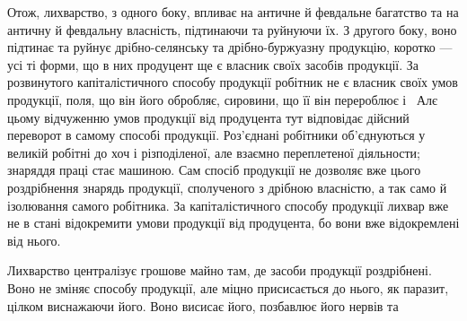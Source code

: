 Отож, лихварство, з одного боку, впливає на античне й февдальне багатство
та на античну й февдальну власність, підтинаючи та руйнуючи їх. З другого
боку, воно підтинає та руйнує дрібно-селянську та дрібно-буржуазну
продукцію, коротко — усі ті форми, що в них продуцент ще є власник своїх
засобів продукції. За розвинутого капіталістичного способу продукції робітник
не є власник своїх умов продукції, поля, що він його обробляє, сировини, що
її він перероблює і~ Алє цьому відчуженню умов продукції від продуцента
тут відповідає дійсний переворот в самому способі продукції. Роз’єднані
робітники об’єднуються у великій робітні до хоч і різподіленої, але взаємно
переплетеної діяльности; знаряддя праці стає машиною. Сам спосіб продукції не
дозволяє вже цього роздрібнення знарядь продукції, сполученого з дрібною власністю,
а так само й ізолювання самого робітника. За капіталістичного способу
продукції лихвар вже не в стані відокремити умови продукції від продуцента, бо
вони вже відокремлені від нього.

Лихварство централізує грошове майно там, де засоби продукції роздрібнені.
Воно не зміняє способу продукції, але міцно присисається до нього, як
паразит, цілком виснажаючи його. Воно висисає його, позбавлює його нервів та
\parbreak{}  %
